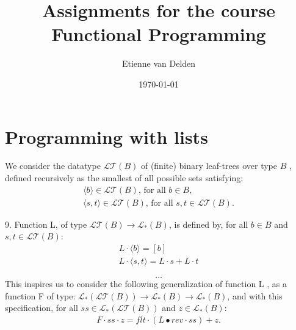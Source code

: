\documentclass[12pt]{article}
\begin{document}
	
	
	\title{Assignments for the course Functional Programming}
	
	\author{Etienne van Delden}
		
	\date{\today}
	
		
	\maketitle
	
	
	
	\section{Programming with lists} 
	
    We consider the datatype $\mathcal{LT}(B)$  of (finite) binary leaf-trees over type $B$ , defined recursively as the smallest of all possible sets satisfying:
    \begin{displaymath}\begin{array}{l}
        \langle b \rangle \in \mathcal{LT}(B) \textrm{, for all }b \in B ,\\
        \langle s,t \rangle \in \mathcal{LT}(B) \textrm{, for all }s,t \in \mathcal{LT}(B).
    \end{array}\end{displaymath}
    
9. Function L, of type $\mathcal{LT}(B) \rightarrow \mathcal{L}_{*}(B)$, is defined by, for all $b \in B$ and $s,t \in \mathcal{LT}(B)$:
    \begin{displaymath}\begin{array}{l}
        L\cdot \langle b \rangle = [b] \\
        L \cdot \langle s,t \rangle = L·s+L·t
    \end{array}\end{displaymath}
    
    \[\ldots \] This inspires us to consider the following generalization of function L , as a function F of type: $\mathcal{L}_{*}(\mathcal{LT}(B)) \rightarrow \mathcal{L}_{*}(B) \rightarrow \mathcal{L}_{*}(B)$, and with this specification, for all $ss \in \mathcal{L}_{*}(\mathcal{LT}(B))$ and $z \in \mathcal{L}_{*}(B)$:
    \begin{displaymath}\begin{array}{l}
        F \cdot ss \cdot z = flt·(L\bullet rev \cdot ss) + z .
    \end{array}\end{displaymath}
\end{document}
